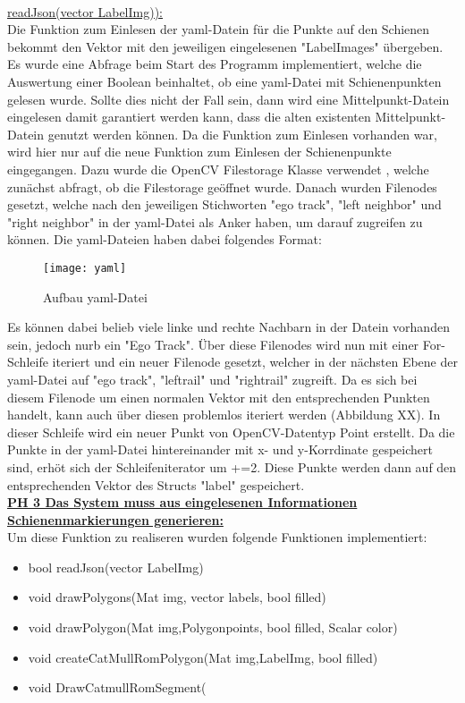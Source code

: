 \documentclass[11pt]{scrartcl}
\begin{document}
\noindent
\\
\noindent
\underline{readJson(vector LabelImg)):}
\\

\noindent
Die Funktion zum Einlesen der yaml-Datein für die Punkte auf den Schienen bekommt den Vektor mit den jeweiligen eingelesenen "LabelImages" übergeben. Es wurde eine Abfrage beim Start des Programm implementiert, welche die Auswertung einer Boolean beinhaltet, ob eine yaml-Datei mit Schienenpunkten gelesen wurde. Sollte dies nicht der Fall sein, dann wird eine Mittelpunkt-Datein eingelesen damit garantiert werden kann, dass die alten existenten Mittelpunkt-Datein genutzt werden können. Da die Funktion zum Einlesen vorhanden war, wird hier nur auf die neue Funktion zum Einlesen der Schienenpunkte eingegangen. Dazu wurde die OpenCV Filestorage Klasse verwendet , welche zunächst abfragt, ob die Filestorage geöffnet wurde. Danach wurden Filenodes gesetzt, welche nach den jeweiligen Stichworten "ego track", "left neighbor" und "right neighbor" in der yaml-Datei als Anker haben, um darauf zugreifen zu können. Die yaml-Dateien haben dabei folgendes Format:
\begin{figure}[H]
  \texttt{[image: yaml]}
  \caption{Aufbau yaml-Datei}
\end{figure}
\noindent
Es können dabei belieb viele linke und rechte Nachbarn in der Datein vorhanden sein, jedoch nurb ein "Ego Track". Über diese Filenodes wird nun mit einer For-Schleife iteriert und ein neuer Filenode gesetzt, welcher in der nächsten Ebene der yaml-Datei auf "ego track", "leftrail" und "rightrail" zugreift. Da es sich bei diesem Filenode um einen normalen Vektor mit den entsprechenden Punkten handelt, kann auch über diesen problemlos iteriert werden (Abbildung XX). In dieser Schleife wird ein neuer Punkt von OpenCV-Datentyp Point erstellt. Da die Punkte in der yaml-Datei hintereinander mit x- und y-Korrdinate gespeichert sind, erhöt sich der Schleifeniterator um +=2. Diese Punkte werden dann auf den entsprechenden Vektor des Structs "label" gespeichert.
\\

\noindent
\underline{\textbf {PH 3 Das System muss aus eingelesenen Informationen Schienenmarkierungen generieren:}}
\\

\noindent
Um diese Funktion zu realiseren wurden folgende Funktionen implementiert:
\begin{itemize}
	\item bool readJson(vector LabelImg)
	\item void drawPolygons(Mat img, vector labels, bool filled)
	\item void drawPolygon(Mat img,Polygonpoints, bool filled, Scalar color)
	\item void createCatMullRomPolygon(Mat img,LabelImg, bool filled)
	\item void DrawCatmullRomSegment(
\end{itemize}
\end{document}
